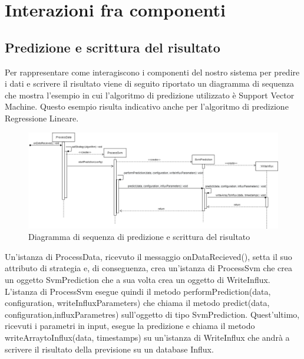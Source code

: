 \section{Interazioni fra componenti}
	\subsection{Predizione e scrittura del risultato}
	Per rappresentare come interagiscono i componenti del nostro sistema per predire i dati e scrivere il risultato viene di seguito riportato un diagramma di sequenza che mostra l'esempio in cui l'algoritmo di predizione utilizzato è Support Vector Machine. Questo esempio risulta indicativo anche per l'algoritmo di predizione Regressione Lineare.  
	\mbox{}
	\begin{landscape}
		\begin{figure} [H]
			\includegraphics[width=\linewidth]{./img/Diagrammi/ds1.png}
			\caption{Diagramma di sequenza di predizione e scrittura del risultato}
		\end{figure}
	\end{landscape}
	Un'istanza di ProcessData, ricevuto il messaggio onDataRecieved(), setta il suo attributo di strategia e, di conseguenza, crea un'istanza di ProcessSvm che crea un oggetto SvmPrediction che a sua volta crea un oggetto di WriteInflux.
	L'istanza di ProcessSvm esegue quindi il metodo performPrediction(data, configuration, writeInfluxParameters) che chiama il metodo predict(data, configuration,influxParametres) sull'oggetto di tipo SvmPrediction. Quest'ultimo, ricevuti i parametri in input, esegue la predizione e chiama il metodo writeArraytoInflux(data, timestamps) su un'istanza di WriteInflux che andrà a scrivere il risultato della previsione su un database Influx.
	

